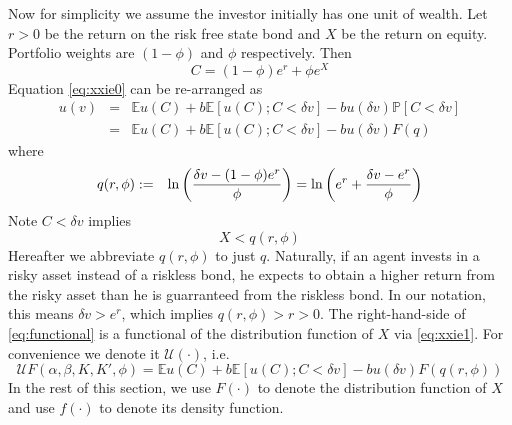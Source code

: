 \documentclass{article}
\newcommand{\E}{
  \mathbb{E}
}
\renewcommand{\P}{
  \mathbb{P}
}
\newcommand{\1}[1]{
  \mathbf{1}_{\{#1\}}
}
\begin{document}
Now for simplicity we assume the investor initially has one unit of
wealth. Let $r > 0$ be the return on the risk free state bond and $X$
be the return on equity. Portfolio weights are $\left(1-\phi\right)$
and $\phi$ respectively. Then
\begin{equation}
  \label{eq:xxie1}
  C = (1 - \phi) e^r + \phi e^X
\end{equation}
Equation \eqref{eq:xxie0} can be re-arranged as
\begin{eqnarray}
u(v) &=& \E u(C) + b \E [u(C); C < \delta v] - b u(\delta v) \P[C < \delta v] \nonumber \\
&=& \E u(C) + b \E [u(C); C < \delta v] - b u(\delta v) F(q) \label{eq:functional}
\end{eqnarray}
where
\begin{eqnarray*}
  q(r, \phi) &:=& \ln \left( {
    \delta v - (1 - \phi) e^r
    \over
    \phi
} \right) = \ln\left(
e^r + {\delta v - e^r \over \phi}
\right)
\end{eqnarray*}
Note $C < \delta v$ implies
\[
X < q(r, \phi)
\]
Hereafter we abbreviate $q(r, \phi)$ to just $q$. 
Naturally, if an agent invests in a risky asset instead of a riskless
bond, he expects to obtain a higher return from the risky asset than
he is guarranteed from the riskless bond. In our notation,
this means $\delta v > e^r$, which implies $q(r, \phi) > r > 0$.
The right-hand-side of \eqref{eq:functional} is a functional of the
distribution function of $X$ via \eqref{eq:xxie1}. For convenience
we denote it $\mathcal U(\cdot)$, i.e.
\[
\mathcal U F (\alpha, \beta, K, K', \phi)
= 
\E u(C) + b \E [u(C); C < \delta v] - b u(\delta v) F(q(r, \phi))
\]
In the rest of this section, we use $F(\cdot)$ to denote the
distribution function of $X$ and use $f(\cdot)$ to denote its density
function.
\end{document}
